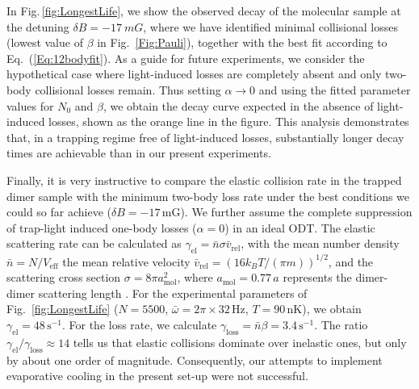 In Fig.\,\ref{fig:LongestLife}, we show the observed decay of the molecular sample at the detuning $\delta B=-\SI{17}{mG}$, where we have identified minimal collisional losses (lowest value of $\beta$ in Fig.~\ref{Fig:Pauli}), together with the best fit according to Eq.~(\ref{Eq:12bodyfit}). As a guide for future experiments, we consider the hypothetical case where light-induced losses are completely absent and only two-body collisional losses remain. Thus setting $\alpha \rightarrow 0$ and using the fitted parameter values for $N_0$ and $\beta$, we obtain the decay curve expected in the absence of light-induced losses, shown as the orange line in the figure. This analysis demonstrates that, in a trapping regime free of light-induced losses, substantially longer decay times are achievable than in our present experiments.

Finally, it is very instructive to compare the elastic collision rate in the trapped dimer sample with the {minimum two-body loss rate under the best conditions we could so far achieve ($\delta B = -17\, {\mathrm{mG}}$). We further assume the complete suppression of trap-light induced one-body losses ($\alpha = 0$) in an ideal ODT.} The elastic scattering rate can be calculated as 
$\gamma_{\mathrm{el}} = \bar{n} \sigma \bar{v}_{\mathrm{rel}}$, 
with the mean number density 
$\bar{n} = N/V_{\mathrm{eff}} $ the mean relative velocity $\bar{v}_{\mathrm{rel}} = (16 k_B T/(\pi m))^{1/2}$,
and the scattering cross section $\sigma = 8\pi a_{\mathrm{mol}}^2$, where $a_{\mathrm{mol}} = 0.77\,a$ represents the dimer-dimer scattering length \cite{Petrov2005dmi, Marcelis2008cpo}. For the experimental parameters of Fig.~\ref{fig:LongestLife} ($N= 5500$, $\bar{\omega} = 2\pi \times 32$\,Hz, $T = 90\,$nK), we obtain $\gamma_{\mathrm{el}} = 48\,{\mathrm{s}}^{-1}$. For the loss rate, we calculate $\gamma_{\mathrm{loss}} = \bar{n} \beta = 3.4\,{\mathrm{s}}^{-1}$.
The ratio $\gamma_{\mathrm{el}}/\gamma_{\mathrm{loss}} \approx 14$ tells us that elastic collisions dominate over inelastic ones, but only by about one order of magnitude. 
Consequently, our attempts to implement evaporative cooling in the present set-up were not successful.


